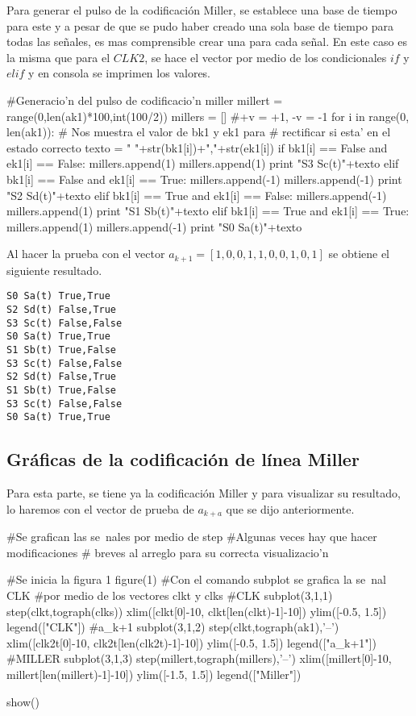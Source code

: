 \documentclass{article}
\begin{document}
Para generar el pulso de la codificación Miller, se establece una base de tiempo para este y a pesar de que se pudo haber creado una sola base de tiempo para todas las señales, es mas comprensible crear una para cada señal. En este caso es la misma que para el $CLK2$, se hace el vector por medio de los condicionales $if$ y $elif$ y en consola se imprimen los valores.

\begin{python}
#Generacio'n del pulso de codificacio'n miller
millert = range(0,len(ak1)*100,int(100/2))
millers = []
#+v = +1, -v = -1
for i in range(0, len(ak1)):
    # Nos muestra el valor de bk1 y ek1 para
    # rectificar si esta' en el estado correcto
    texto = " "+str(bk1[i])+","+str(ek1[i])
    if   bk1[i] == False and ek1[i] == False:
        millers.append(1)
        millers.append(1)
        print "S3 Sc(t)"+texto
    elif bk1[i] == False and ek1[i] == True:
        millers.append(-1)
        millers.append(-1)
        print "S2 Sd(t)"+texto
    elif bk1[i] == True  and ek1[i] == False:
        millers.append(-1)
        millers.append(1)
        print "S1 Sb(t)"+texto
    elif bk1[i] == True  and ek1[i] == True:
        millers.append(1)
        millers.append(-1)
        print "S0 Sa(t)"+texto
\end{python}

Al hacer la prueba con el vector $a_{k+1}=[1,0,0,1,1,0,0,1,0,1]$ se obtiene el siguiente resultado.

\begin{verbatim}
S0 Sa(t) True,True
S2 Sd(t) False,True
S3 Sc(t) False,False
S0 Sa(t) True,True
S1 Sb(t) True,False
S3 Sc(t) False,False
S2 Sd(t) False,True
S1 Sb(t) True,False
S3 Sc(t) False,False
S0 Sa(t) True,True
\end{verbatim}

\subsection{Gráficas de la codificación de línea Miller}

Para esta parte, se tiene ya la codificación Miller y para visualizar su resultado, lo haremos con el vector de prueba de $a_{k+a}$ que se dijo anteriormente. 

\begin{python}
#Se grafican las se~nales por medio de step
#Algunas veces hay que hacer modificaciones
# breves al arreglo para su correcta visualizacio'n

#Se inicia la figura 1
figure(1)
#Con el comando subplot se grafica la se~nal CLK
#por medio de los vectores clkt y clks
#CLK
subplot(3,1,1)
step(clkt,tograph(clks))
xlim([clkt[0]-10, clkt[len(clkt)-1]-10])
ylim([-0.5, 1.5])
legend(["CLK"])
#a_{k+1}
subplot(3,1,2)
step(clkt,tograph(ak1),'--')
xlim([clk2t[0]-10, clk2t[len(clk2t)-1]-10])
ylim([-0.5, 1.5])
legend(["a_{k+1}"])
#MILLER
subplot(3,1,3)
step(millert,tograph(millers),'--')
xlim([millert[0]-10, millert[len(millert)-1]-10])
ylim([-1.5, 1.5])
legend(["Miller"])

show()
\end{python}
\end{document}
